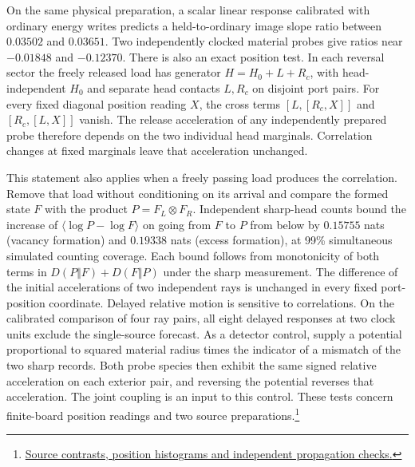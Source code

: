 \documentclass[11pt]{article}
\begin{document}
On the same physical preparation, a scalar linear response calibrated
with ordinary energy writes predicts a held-to-ordinary image slope ratio
between $0.03502$ and $0.03651$. Two independently clocked material probes
give ratios near $-0.01848$ and $-0.12370$. There is also an exact
position test. In each reversal sector the freely released load has
generator $H=H_0+L+R_c$, with head-independent $H_0$ and separate
head contacts $L,R_c$ on disjoint port pairs. For every fixed diagonal
position reading $X$, the cross terms $[L,[R_c,X]]$ and $[R_c,[L,X]]$
vanish. The release acceleration of any independently prepared probe
therefore depends on the two individual head marginals. Correlation
changes at fixed marginals leave that acceleration unchanged.

This statement also applies when a freely passing load produces the
correlation. Remove that load without conditioning on its arrival and
compare the formed state $F$ with the product $P=F_L\otimes F_R$.
Independent sharp-head counts bound the increase of
$\langle\log P-\log F\rangle$ on going from $F$ to $P$ from below by
$0.15755$ nats (vacancy formation) and $0.19338$ nats (excess formation),
at 99\% simultaneous simulated counting coverage. Each bound follows
from monotonicity of both terms in $D(P\Vert F)+D(F\Vert P)$ under
the sharp measurement. The difference of the initial accelerations of two
independent rays is unchanged in every fixed port-position coordinate.
Delayed relative motion is sensitive to correlations. On the calibrated
comparison of four ray pairs, all eight delayed responses at two clock units
exclude the single-source forecast. As a detector control, supply a
potential proportional to squared material radius times the indicator
of a mismatch of the two sharp records. Both probe species then exhibit
the same signed relative acceleration on each exterior pair, and
reversing the potential reverses that acceleration. The joint coupling
is an input to this control. These tests concern finite-board position readings and two source preparations.\footnote{\href{https://github.com/FloatingPragma/observer-patch-holography/tree/main/openwave/interval_echo/row_19/recovery_identity}{Source contrasts, position histograms and independent propagation checks.}}
\end{document}
